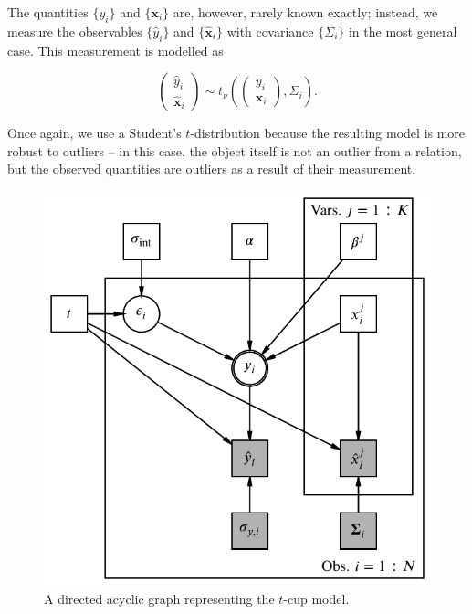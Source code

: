 \documentclass[fleqn,usenatbib]{mnras}
\newcommand{\studentt}[2]{t_\nu \left( #1, #2 \right)}
\newcommand{\depvar}{y_i}
\newcommand{\indepvars}{\boldsymbol{x}_i}
\newcommand{\obsdep}{\hat{y}_i}
\newcommand{\obsindep}{\hat{\boldsymbol{x}}_i}
\newcommand{\obserr}{\Sigma_i}
\begin{document}
The quantities $\{\depvar\}$ and $\{\indepvars\}$ are, however, rarely known
exactly; instead, we measure the observables $\{\obsdep\}$ and $\{\obsindep\}$
with covariance $\{\obserr\}$ in the most general case. This measurement is
modelled as

\begin{equation}
    \begin{pmatrix}
        \obsdep \\ \obsindep
    \end{pmatrix}
    \sim
    \studentt{
        \begin{pmatrix}
            \depvar \\ \indepvars
        \end{pmatrix}
    }{
        \obserr
    }.
\end{equation}

Once again, we use a Student's $t$-distribution because the resulting model is
more robust to outliers -- in this case, the object itself is not an outlier
from a relation, but the observed quantities are outliers as a result of their
measurement.

\begin{figure}
	\includegraphics[width=\columnwidth]{graphics/dag.pdf}
    \caption{A directed acyclic graph representing the $t$-cup model.}
    \label{fig:formalism.dag}
\end{figure}
\end{document}
